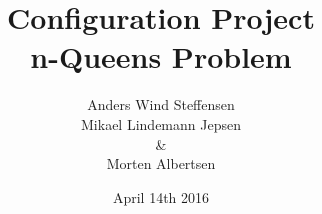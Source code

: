 \pagestyle{empty}


\title{Configuration Project \\\large n-Queens Problem}
\author{Anders Wind Steffensen\\Mikael Lindemann Jepsen\\\&\\Morten Albertsen}
\date{\vspace{\baselineskip}April 14th 2016}



\maketitle
\clearpage



